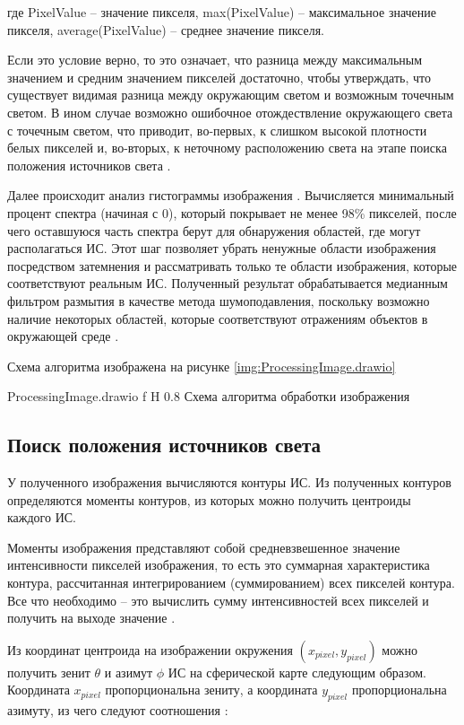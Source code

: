 где PixelValue -- значение пикселя, max(PixelValue) -- максимальное значение пикселя, average(PixelValue) -- среднее значение пикселя.

Если это условие верно, то это означает, что разница между максимальным значением и средним значением пикселей достаточно, чтобы утверждать, что существует видимая разница между окружающим светом и возможным точечным светом. В ином случае возможно ошибочное отождествление окружающего света с точечным светом, что приводит, во-первых, к слишком высокой плотности белых пикселей и, во-вторых, к неточному расположению света на этапе поиска положения источников света \cite{osti2019real}.

Далее происходит анализ гистограммы изображения \cite{img_hists}. Вычисляется минимальный процент спектра (начиная с 0), который покрывает не менее 98\% пикселей, после чего оставшуюся часть спектра берут для обнаружения областей, где могут располагаться ИС. Этот шаг позволяет убрать ненужные области изображения посредством затемнения и рассматривать только те области изображения, которые соответствуют реальным ИС. Полученный результат обрабатывается медианным фильтром размытия в качестве метода шумоподавления, поскольку возможно наличие некоторых областей, которые соответствуют отражениям объектов в окружающей среде \cite{osti2019real}.

Схема алгоритма изображена на рисунке \ref{img:ProcessingImage.drawio}

{ProcessingImage.drawio}
{f}
{H}
{0.8\textwidth}
{Схема алгоритма обработки изображения}

\subsection{Поиск положения источников света}

У полученного изображения вычисляются контуры ИС. Из полученных контуров определяются моменты контуров, из которых можно получить центроиды каждого ИС. 

Моменты изображения представляют собой средневзвешенное значение интенсивности пикселей изображения, то есть это суммарная характеристика контура, рассчитанная интегрированием (суммированием) всех пикселей контура. Все что необходимо -- это вычислить сумму интенсивностей всех пикселей и получить на выходе значение \cite{sns_tras}.

Из координат центроида на изображении окружения $(x_{pixel}, y_{pixel})$ можно получить зенит $\theta$ и азимут $\phi$ ИС на сферической карте следующим образом. Координата $x_{pixel}$ пропорциональна зениту, а координата $y_{pixel}$ пропорциональна азимуту, из чего следуют соотношения \cite{osti2019real}:

